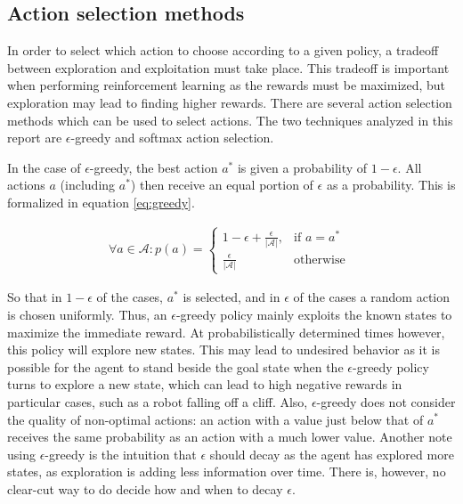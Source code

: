 \documentclass{article}
\begin{document}
\subsection{Action selection methods}
In order to select which action to choose according to a given policy, a tradeoff between exploration and exploitation must take place. This tradeoff is important when performing reinforcement learning as the rewards must be maximized, but exploration may lead to finding higher rewards. There are several action selection methods which can be used to select actions. The two techniques analyzed in this report are $\epsilon$-greedy and softmax action selection.

In the case of $\epsilon$-greedy, the best action $a^*$ is given a probability of $1-\epsilon$. All actions $a$ (including $a^*$) then receive an equal portion of $\epsilon$ as a probability. This is formalized in equation \ref{eq:greedy}.
\begin{mdframed}
\begin{align}
\forall a \in \mathcal{A}:p(a) = 
\begin{cases}\label{eq:greedy}
	1 - \epsilon + \frac{\epsilon}{|\mathcal{A}|}, & \text{if } a = a^*\\
	\frac{\epsilon}{|\mathcal{A}|} & \text{otherwise }
\end{cases}
\end{align}
\end{mdframed}
So that in $1-\epsilon$ of the cases, $a^*$ is selected, and in $\epsilon$ of the cases a random action is chosen uniformly. Thus, an $\epsilon$-greedy policy mainly exploits the known states to maximize the immediate reward. At probabilistically determined times however, this policy will explore new states. This may lead to undesired behavior as it is possible for the agent to stand beside the goal state when the $\epsilon$-greedy policy turns to explore a new state, which can lead to high negative rewards in particular cases, such as a robot falling off a cliff. Also, $\epsilon$-greedy does not consider the quality of non-optimal actions: an action with a value just below that of $a^*$ receives the same probability as an action with a much lower value. Another note using $\epsilon$-greedy is the intuition that $\epsilon$ should decay as the agent has explored more states, as exploration is adding less information over time. There is, however, no clear-cut way to do decide how and when to decay $\epsilon$.
\end{document}
